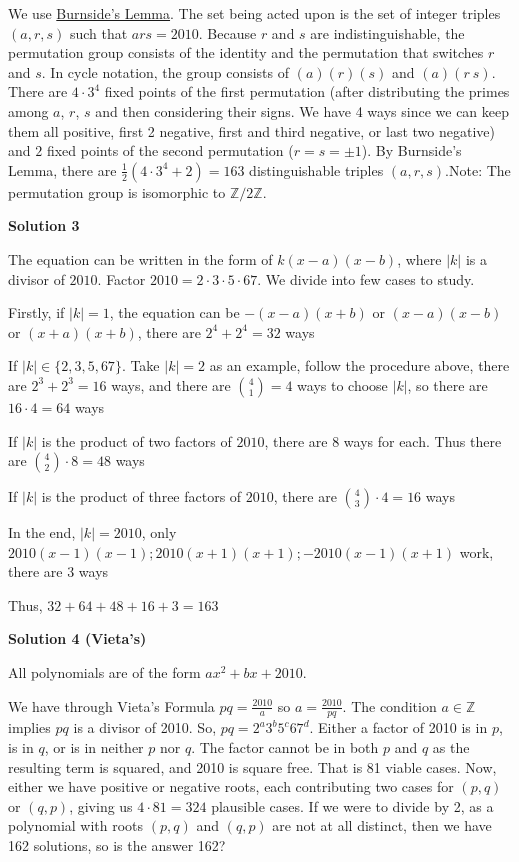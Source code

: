 \begin{enumerate}
We use \href{https://artofproblemsolving.com/wiki/index.php?title=Burnside\%27s\_Lemma}{Burnside's Lemma}. The set being acted upon is the set of integer triples $(a,r,s)$ such that $ars=2010$. Because $r$ and $s$ are indistinguishable, the permutation group consists of the identity and the permutation that switches $r$ and $s$. In cycle notation, the group consists of $(a)(r)(s)$ and $(a)(r \: s)$. There are $4 \cdot 3^4$ fixed points of the first permutation (after distributing the primes among $a$, $r$, $s$ and then considering their signs. We have 4 ways since we can keep them all positive, first 2 negative, first and third negative, or last two negative) and $2$ fixed points of the second permutation ($r=s=\pm 1$). By Burnside's Lemma, there are $\frac{1}{2} (4 \cdot 3^4+2)= \boxed{163}$ distinguishable triples $(a,r,s)$.Note: The permutation group is isomorphic to $\mathbb{Z}/2\mathbb{Z}$.

 



\textbf{Solution 3}

The equation can be written in the form of $k(x-a)(x-b)$, where $|k|$ is a divisor of $2010$. Factor $2010=2\cdot 3\cdot 5\cdot 67$. We divide into few cases to study. 

 Firstly, if $|k|=1$, the equation can be $-(x-a)(x+b)$ or $(x-a)(x-b)$ or $(x+a)(x+b)$, there are $2^4+2^4=32$ ways

 If $|k|\in \{2,3,5,67\}$. Take $|k|=2$ as an example, follow the procedure above, there are $2^3+2^3=16$ ways, and there are $\binom {4}{1}=4$ ways to choose $|k|$, so there are $16\cdot 4=64$ ways

 
If $|k|$ is the product of two factors of $2010$, there are $8$ ways for each. Thus there are $\binom {4}{2}\cdot 8=48$ ways

 If $|k|$ is the product of three factors of $2010$, there are $\binom {4}{3}\cdot 4=16$ ways

 In the end, $|k|=2010$, only $2010(x-1)(x-1); 2010(x+1)(x+1); -2010(x-1)(x+1)$ work, there are $3$ ways

 Thus, $32+64+48+16+3=\boxed{163}$




\textbf{Solution 4 (Vieta's)}

All polynomials are of the form $ax^2 + bx + 2010$.

 We have through Vieta's Formula $pq = \frac{2010}{a}$ so $a = \frac{2010}{pq}$. The condition $a \in \mathbb{Z}$ implies $pq$ is a divisor of 2010. So, $pq = 2^a3^b5^c67^d$. Either a factor of 2010 is in $p$, is in $q$, or is in neither $p$ nor $q$. The factor cannot be in both $p$ and $q$ as the resulting term is squared, and 2010 is square free. That is 81 viable cases. Now, either we have positive or negative roots, each contributing two cases for $(p,q)$ or $(q,p)$, giving us $4 \cdot 81 = 324$ plausible cases. If we were to divide by 2, as a polynomial with roots $(p,q)$ and $(q,p)$ are not at all distinct, then we have 162 solutions, so is the answer 162?


\end{enumerate}
